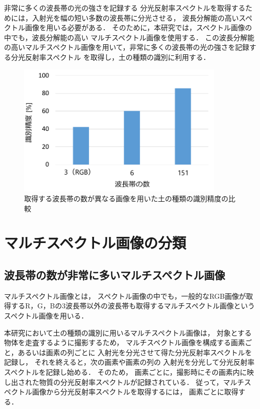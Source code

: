 非常に多くの波長帯の光の強さを記録する
分光反射率スペクトルを取得するためには，入射光を幅の短い多数の波長帯に分光させる，
波長分解能の高いスペクトル画像を用いる必要がある．
そのために，本研究では，スペクトル画像の中でも，波長分解能の高い
マルチスペクトル画像を使用する．
この波長分解能の高いマルチスペクトル画像を用いて，非常に多くの波長帯の光の強さを記録する分光反射率スペクトル
を取得し，土の種類の識別に利用する．

\begin{figure}[b]
	\begin{center}
	\centering
	\includegraphics[width=10cm]{./Ch3_SoilTypeDiscrimination/Fig/discrimination_accuracy_by_wavelength_number_compressed.pdf}
	\caption{取得する波長帯の数が異なる画像を用いた土の種類の識別精度の比較}\label{fig:discrimination_accuracy_by_wavelength_number}
	\vspace{1cm}
	\end{center}
\end{figure}

\clearpage


\section{マルチスペクトル画像の分類}
\label{sec:ClassificationOfHyperspectralImage}

\subsection{波長帯の数が非常に多いマルチスペクトル画像}
\label{ssec:HyperspectralImage}

マルチスペクトル画像とは，
スペクトル画像の中でも，一般的なRGB画像が取得するR，G，Bの3波長帯以外の波長帯も取得するマルチスペクトル画像というスペクトル画像を用いる\cite{中野1996}．

本研究において土の種類の識別に用いるマルチスペクトル画像は，
対象とする物体を走査するように撮影するため，
マルチスペクトル画像を構成する画素ごと，あるいは画素の列ごとに%
入射光を分光させて得た分光反射率スペクトルを記録し，
それを終えると，次の画素や画素の列の
入射光を分光して分光反射率スペクトルを記録し始める．
そのため，
画素ごとに，撮影時にその画素内に映し出された物質の分光反射率スペクトルが記録されている．
従って，マルチスペクトル画像から分光反射率スペクトルを取得するには，
画素ごとに取得する．

